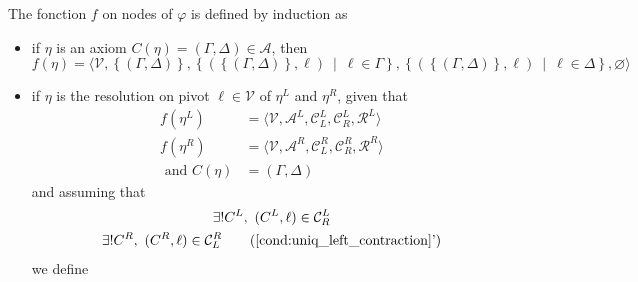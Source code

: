 \documentclass{article}
\newcommand{\ens}[2]{\left\{ #1 ~ \middle| ~ #2 \right\}}
\newcommand{\varSet}{\mathcal{V}}
\newcommand{\axiomSet}{\mathcal{A}}
\newcommand{\conSet}{\mathcal{C}}
\newcommand{\resoSet}{\mathcal{R}}
\newcommand{\Proof}{\varphi}
\newcommand{\node}{\eta}
\newcommand{\conc}[1]{C\left(#1\right)}
\begin{document}
The fonction $f$ on nodes of $\Proof$ is defined by induction as \begin{itemize}
  \item if $\node$ is an axiom $\conc{\node} = (\Gamma, \Delta) \in \axiomSet$, then
    $$f(\node) = \langle \varSet, \left\{ (\Gamma, \Delta) \right\},
                        \ens{\left(\left\{(\Gamma, \Delta)\right\}, \ell\right)}{\ell \in \Gamma},
                        \ens{\left(\left\{(\Gamma, \Delta)\right\}, \ell\right)}{\ell \in \Delta},
                        \varnothing \rangle$$
  \item if $\node$ is the resolution on pivot $\ell \in \varSet$ of $\node^L$ and $\node^R$, given
  that
  \begin{align*}
    f(\node^L) &= \langle \varSet, \axiomSet^L, \conSet_L^L, \conSet_R^L, \resoSet^L \rangle \\
    f(\node^R) &= \langle \varSet, \axiomSet^R, \conSet_L^R, \conSet_R^R, \resoSet^R \rangle \\
    \text{ and }
    \conc{\node} &= (\Gamma, \Delta)
  \end{align*}
  and assuming that
  \begin{gather}
    \exists! C^L ,~ (C^L,\ell) \in \conSet_R^L \label{cond:uniq_left_contraction} \\
    \exists! C^R ,~ (C^R,\ell) \in \conSet_L^R \tag{\ref{cond:uniq_left_contraction}'}
  \end{gather}
  we define
\end{itemize}
\end{document}
